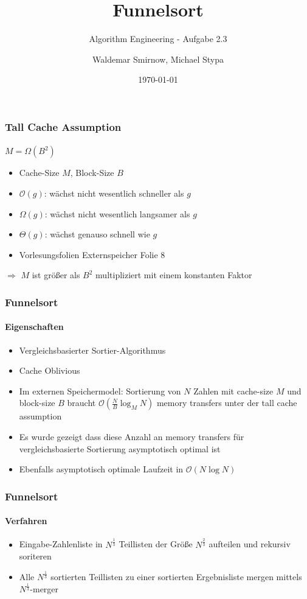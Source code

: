 \documentclass{beamer}
\title{Funnelsort}
\subtitle{Algorithm Engineering - Aufgabe 2.3}
\author{Waldemar Smirnow, Michael Stypa}
\institute{Universität Osnabrück}
\date{\today}
\begin{document}
\begin{frame}
  \titlepage
\end{frame}

\begin{frame}
  \frametitle{Tall Cache Assumption}
  \framesubtitle{}
  \begin{center}
    \Large
    $M = \Omega\left(B^2\right)$
  \end{center}
  \begin{itemize}
    \item Cache-Size $M$, Block-Size $B$
    \item $\mathcal{O}\left(g\right)$: wächst nicht wesentlich schneller als $g$
    \item $\Omega\left(g\right)$: wächst nicht wesentlich langsamer als $g$
    \item $\Theta\left(g\right)$: wächst genauso schnell wie $g$
    \item Vorlesungsfolien Externspeicher Folie 8
  \end{itemize}
  $\Rightarrow$ $M$ ist größer als $B^2$ multipliziert mit einem konstanten Faktor
\end{frame}

\begin{frame}
  \frametitle{Funnelsort}
  \framesubtitle{Eigenschaften}
  \begin{itemize}
    \item Vergleichsbasierter Sortier-Algorithmus
    \item Cache Oblivious
    \item Im externen Speichermodel: Sortierung von $N$ Zahlen
      mit cache-size $M$ und block-size $B$
      braucht $\mathcal{O}\left(\frac{N}{B}\log_M{N}\right)$ memory transfers
      unter der tall cache assumption
    \item Es wurde gezeigt dass diese Anzahl an memory transfers
      für vergleichsbasierte Sortierung asymptotisch optimal ist
    \item Ebenfalls asymptotisch optimale Laufzeit in $\mathcal{O}\left(N\log{N}\right)$
  \end{itemize}
\end{frame}

\begin{frame}
  \frametitle{Funnelsort}
  \framesubtitle{Verfahren}
  \begin{itemize}
    \item Eingabe-Zahlenliste in $N^{\frac{1}{3}}$ Teillisten
      der Größe $N^{\frac{2}{3}}$ aufteilen und rekursiv soriteren
    \item Alle $N^{\frac{1}{3}}$ sortierten Teillisten zu einer
      sortierten Ergebnisliste mergen mittels $N^{\frac{1}{3}}$-merger
  \end{itemize}
\end{frame}
\end{document}
